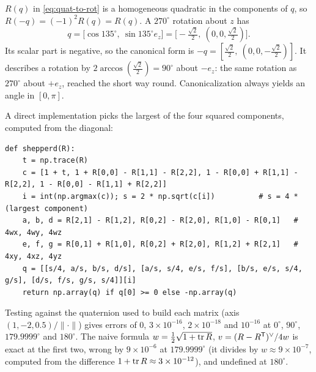\begin{solutions}
  \item $R(q)$ in \eqref{eq:quat-to-rot} is a homogeneous quadratic in the components of $q$, so $R(-q) = (-1)^2R(q) = R(q)$. A $270^\circ$ rotation about
        $z$ has
        \[
          q = \big[\cos135^\circ,\ \sin135^\circ e_z\big] = \big[-\tfrac{\sqrt2}{2},\ (0, 0, \tfrac{\sqrt2}{2})\big].
        \]
        Its scalar part is negative, so the canonical form is $-q = [\tfrac{\sqrt2}{2},\ (0, 0, -\tfrac{\sqrt2}{2})]$. It describes a rotation by
        $2\arccos(\tfrac{\sqrt2}2) = 90^\circ$ about $-e_z$: the same rotation as $270^\circ$ about $+e_z$, reached the short way round. Canonicalization
        always yields an angle in $[0, \pi]$.

  \item A direct implementation picks the largest of the four squared components, computed from the diagonal:
\begin{lstlisting}[style=py]
def shepperd(R):
    t = np.trace(R)
    c = [1 + t, 1 + R[0,0] - R[1,1] - R[2,2], 1 - R[0,0] + R[1,1] - R[2,2], 1 - R[0,0] - R[1,1] + R[2,2]]
    i = int(np.argmax(c)); s = 2 * np.sqrt(c[i])          # s = 4 * (largest component)
    a, b, d = R[2,1] - R[1,2], R[0,2] - R[2,0], R[1,0] - R[0,1]   # 4wx, 4wy, 4wz
    e, f, g = R[0,1] + R[1,0], R[0,2] + R[2,0], R[1,2] + R[2,1]   # 4xy, 4xz, 4yz
    q = [[s/4, a/s, b/s, d/s], [a/s, s/4, e/s, f/s], [b/s, e/s, s/4, g/s], [d/s, f/s, g/s, s/4]][i]
    return np.array(q) if q[0] >= 0 else -np.array(q)
\end{lstlisting}
        Testing against the quaternion used to build each matrix (axis $(1, -2, 0.5)/\|\cdot\|$) gives errors of $0$, $3\times10^{-16}$, $2\times10^{-18}$ and
        $10^{-16}$ at $0^\circ$, $90^\circ$, $179.9999^\circ$ and $180^\circ$. The naive formula $w = \tfrac12\sqrt{1 + \operatorname{tr} R}$, $v = (R - R^{\mathsf{T}})^{\vee}/4w$ is exact at the first two,
        wrong by $9\times10^{-6}$ at $179.9999^\circ$ (it divides by $w \approx 9\times10^{-7}$, computed from the difference $1 + \operatorname{tr} R \approx 3\times10^{-12}$), and
        undefined at $180^\circ$.


\end{solutions}
